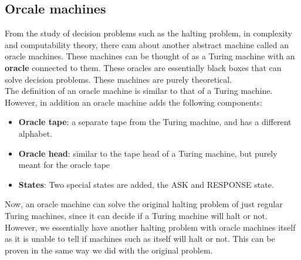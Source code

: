 \documentclass[12pt, letterpaper]{article}
\begin{document}
\subsection{Orcale machines}
From the study of decision problems such as the halting problem, in complexity and computability theory, there cam about another abstract machine called an oracle machines. These machines can be thought of as a Turing machine with an \textbf{oracle} connected to them. These oracles are essentially black boxes that can solve decision problems. These machines are purely theoretical.\\

The definition of an oracle machine is similar to that of a Turing machine. However, in addition an oracle machine adds the following components:
\begin{itemize}
\item \textbf{Oracle tape}: a separate tape from the Turing machine, and has a different alphabet.
\item \textbf{Oracle head}: similar to the tape head of a Turing machine, but purely meant for the oracle tape
\item \textbf{States}: Two special states are added, the ASK and RESPONSE state.
\end{itemize}
Now, an oracle machine can solve the original halting problem of just regular Turing machines, since it can decide if a Turing machine will halt or not. However, we essentially have another halting problem with oracle machines itself as it is unable to tell if machines such as itself will halt or not. This can be proven in the same way we did with the original problem.
\end{document}
